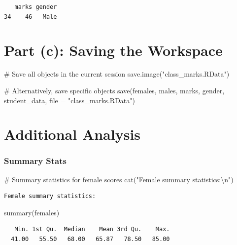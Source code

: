 \documentclass[
  letterpaper,
  DIV=11,
  numbers=noendperiod]{scrartcl}
\newenvironment{Shaded}{\begin{snugshade}}{\end{snugshade}}
\newcommand{\AttributeTok}[1]{\textcolor[rgb]{0.40,0.45,0.13}{#1}}
\newcommand{\CommentTok}[1]{\textcolor[rgb]{0.37,0.37,0.37}{#1}}
\newcommand{\FunctionTok}[1]{\textcolor[rgb]{0.28,0.35,0.67}{#1}}
\newcommand{\NormalTok}[1]{\textcolor[rgb]{0.00,0.23,0.31}{#1}}
\newcommand{\SpecialCharTok}[1]{\textcolor[rgb]{0.37,0.37,0.37}{#1}}
\newcommand{\StringTok}[1]{\textcolor[rgb]{0.13,0.47,0.30}{#1}}
\begin{document}
\begin{verbatim}
   marks gender
34    46   Male
\end{verbatim}

\section{Part (c): Saving the
Workspace}\label{part-c-saving-the-workspace}

\begin{Shaded}
\begin{Highlighting}[]
\CommentTok{\# Save all objects in the current session}
\FunctionTok{save.image}\NormalTok{(}\StringTok{"class\_marks.RData"}\NormalTok{)}

\CommentTok{\# Alternatively, save specific objects}
\FunctionTok{save}\NormalTok{(females, males, marks, gender, student\_data, }\AttributeTok{file =} \StringTok{"class\_marks.RData"}\NormalTok{)}
\end{Highlighting}
\end{Shaded}

\section{Additional Analysis}\label{additional-analysis}

\subsubsection{Summary Stats}\label{summary-stats}

\begin{Shaded}
\begin{Highlighting}[]
\CommentTok{\# Summary statistics for female scores}
\FunctionTok{cat}\NormalTok{(}\StringTok{"Female summary statistics:}\SpecialCharTok{\textbackslash{}n}\StringTok{"}\NormalTok{)}
\end{Highlighting}
\end{Shaded}

\begin{verbatim}
Female summary statistics:
\end{verbatim}

\begin{Shaded}
\begin{Highlighting}[]
\FunctionTok{summary}\NormalTok{(females)}
\end{Highlighting}
\end{Shaded}

\begin{verbatim}
   Min. 1st Qu.  Median    Mean 3rd Qu.    Max. 
  41.00   55.50   68.00   65.87   78.50   85.00 
\end{verbatim}
\end{document}
